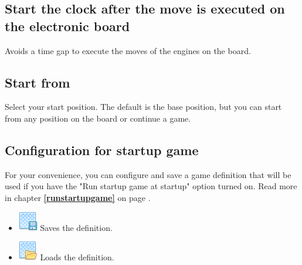 \documentclass[11pt,a4paper]{article}
\begin{document}
\subsection{Start the clock after the move is executed on the electronic board}
Avoids a time gap to execute the moves of the engines on the board.


\subsection{Start from}
Select your start position. The default is the base position, but you can start from any position on the board or continue a game.



\subsection{Configuration for startup game} \label{startupgame}

For your convenience, you can configure and save a game definition that will be used if you have the "Run startup game at startup" option turned on.  Read more in chapter \textbf{\ref{runstartupgame}  } on page \pageref{runstartupgame}.

\begin{itemize}
	  \item \includegraphics[scale=0.5]{layer_save.png} Saves the definition.
  	  \item \includegraphics[scale=0.5]{layer_open.png} Loads the definition.
\end{itemize}
\end{document}
